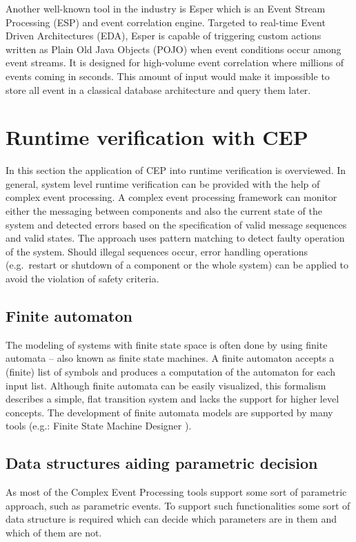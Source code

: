 Another well-known tool in the industry is Esper\citep{esper} which is an Event Stream Processing (ESP) and event correlation engine.
Targeted to real-time Event Driven Architectures (EDA), Esper is capable of triggering custom actions written as Plain Old Java Objects (POJO) when event conditions occur among event streams. It is designed for high-volume event correlation where millions of events coming in seconds. This amount of input would make it impossible to store all event in a classical database architecture and query them later.

\section{Runtime verification with CEP}
In this section the application of CEP into runtime verification is overviewed.
In general, system level runtime verification can be provided with the help of complex event processing. A complex event processing framework can monitor either the messaging between components and also the current state of the system and detected errors based on the specification of valid message sequences and valid states. 
The approach uses pattern matching to detect faulty operation of the system. Should illegal sequences occur, error handling operations (e.g.~restart or shutdown of a component or the whole system) can be applied to avoid the violation of safety criteria.

\subsection{Finite automaton }

The modeling of systems with finite state space is often done by using finite automata -- also known as finite state machines. A finite automaton accepts a (finite) list of symbols and produces a computation of the automaton for each input list.
Although finite automata can be easily visualized, this formalism describes a simple, flat transition system and lacks the support for higher level concepts. The development of finite automata models are supported by many tools (e.g.: Finite State Machine Designer \citep{fsmd}).

\subsection{Data structures aiding parametric decision}
As most of the Complex Event Processing tools support some sort of parametric approach, such as parametric events.
To support such functionalities some sort of data structure is required which can decide which parameters are in them and which of them are not.

